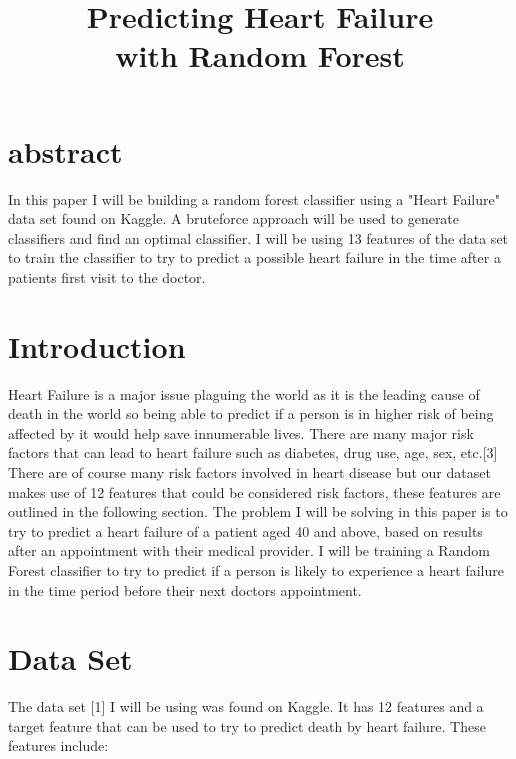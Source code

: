 \documentclass[conference]{IEEEtran}
\begin{document}
\title{Predicting Heart Failure\\ with Random Forest}


\author{
}

\maketitle

\section*{abstract}
In this paper I will be building a random forest classifier using a "Heart Failure" data set found on Kaggle. A bruteforce approach will be used to generate classifiers and find an optimal classifier. I will be using 13 features of the data set to train the classifier to try to predict a possible heart failure in the time after a patients first visit to the doctor.

\section{Introduction}
Heart Failure is a major issue plaguing the world as it is the leading cause of death in the world so being able to predict if a person is in higher risk of being affected by it would help save innumerable lives. There are many major risk factors that can lead to heart failure such as diabetes, drug use, age, sex, etc.[3] There are of course many risk factors involved in heart disease but our dataset makes use of 12 features that could be considered risk factors, these features are outlined in the following section. The problem I will be solving in this paper is to try to predict a heart failure of a patient aged 40 and above, based on results after an appointment with their medical provider. I will be training a Random Forest classifier to try to predict if a person is likely to experience a heart failure in the time period before their next doctors appointment.

\section{Data Set}
The data set [1] I will be using was found on Kaggle. It has 12 features and a target feature that can be used to try to predict death by heart failure. These features include:
\end{document}
